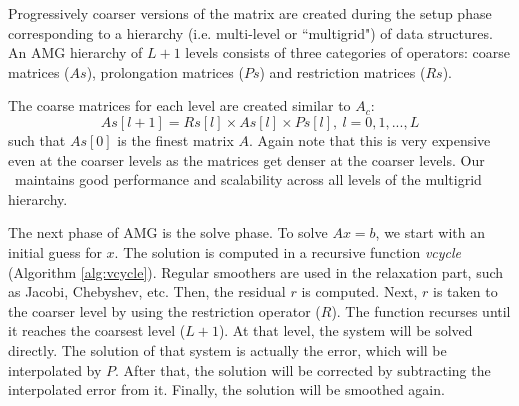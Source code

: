 Progressively coarser versions of the matrix are created during the setup phase corresponding to
a hierarchy (i.e. multi-level or ``multigrid") of data structures.
An AMG hierarchy of $L+1$ levels consists of three categories of operators:
coarse matrices ($As$), prolongation matrices ($Ps$) and restriction matrices ($Rs$).


The coarse matrices for each level are created similar to $A_c$:
\begin{equation*}
 As[l+1] = Rs[l] \times As[l] \times Ps[l],\ l = 0, 1, ..., L
\end{equation*}
such that $As[0]$ is the finest matrix $A$. Again note that this is very expensive even at the coarser levels as the matrices get denser at the coarser levels. Our \mm\ maintains good performance and scalability across all levels of the multigrid hierarchy. 

The next phase of AMG is the solve phase. To solve $Ax = b$, we start with an initial guess for $x$.
%
%
The solution is computed in a recursive function \textit{vcycle} (Algorithm \ref{alg:vcycle}).
Regular smoothers are used in the relaxation part, such as Jacobi, Chebyshev, etc.
Then, the residual $r$ is computed. Next, $r$ is taken to the coarser level by using
the restriction operator ($R$).
The function recurses until it reaches the coarsest level ($L+1$). At that level,
the system will be solved directly. The solution of that system is actually the error,
which will be interpolated by $P$.
After that, the solution will be corrected by subtracting the interpolated error from it.
Finally, the solution will be smoothed again.

